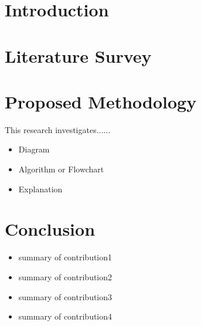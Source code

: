 \documentclass[12pt,a4paper,oneside]{report}
\begin{document}
\tableofcontents

\newpage
\section{Introduction}
\lipsum[2-4]\cite{shaoo2020}







\section{Literature Survey}
\lipsum[2-4]


\section{Proposed Methodology}
This research investigates......
\begin{itemize}
  \item Diagram 
  \item Algorithm or Flowchart
  \item Explanation
  
\end{itemize}





\section{Conclusion}

\begin{itemize}
    \item summary of contribution1
    
    \item summary of contribution2
    
    \item summary of contribution3
    
    \item summary of contribution4
\end{itemize}





\end{document}
